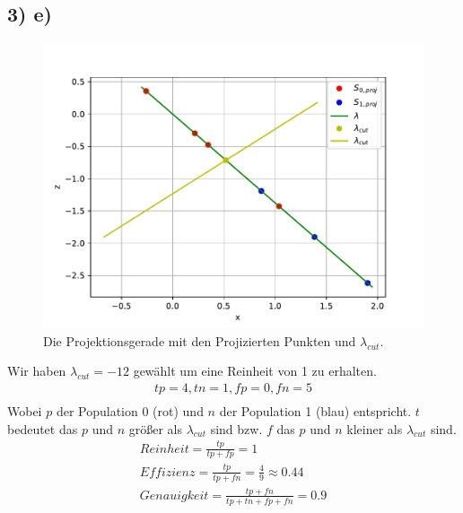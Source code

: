 \subsection*{3) e)}
\begin{figure}[H]
  \includegraphics[width=\linewidth]{Python/Aufgabe3e.pdf}
  \caption{Die Projektionsgerade mit den Projizierten Punkten und $\lambda_{cut}$.}
\end{figure}
Wir haben $\lambda_{cut} = -12$ gewählt um eine Reinheit von 1 zu erhalten.
\begin{align*}
  tp = 4, tn = 1, fp = 0, fn = 5 \\
\end{align*}
Wobei $p$ der Population 0 (rot) und $n$ der Population 1 (blau) entspricht. $t$ bedeutet das $p$ und $n$ größer als $\lambda_{cut}$ sind bzw. $f$ das $p$ und $n$ kleiner als $\lambda_{cut}$ sind.
\begin{align*}
  Reinheit = \frac{tp}{tp + fp} = 1 \\
  Effizienz = \frac{tp}{tp + fn} = \frac{4}{9} \approx 0.44 \\
  Genauigkeit = \frac{tp + fn}{tp + tn + fp + fn} = 0.9
\end{align*}




